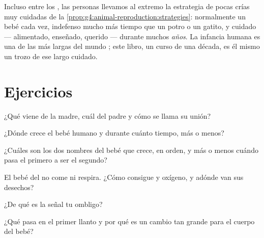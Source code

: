 \begin{example}\label{ex:g5:human-reproduction:longcare}
Incluso entre los , las personas llevamos al extremo la
estrategia de pocas crías muy cuidadas de la
\cref{prop:g4:animal-reproduction:strategies}: normalmente un bebé
cada vez, indefenso mucho más tiempo que un potro o un gatito, y
cuidado --- alimentado, enseñado, querido --- durante muchos
\emph{años}. La infancia humana es una de las más largas del mundo
; este libro, un curso de una década, es él mismo un trozo de
ese largo cuidado.
\end{example}

\section{Ejercicios}

\begin{exercise}[$\star$]\label{exo:g5:human-reproduction:1}
¿Qué  viene de la madre, cuál del padre y cómo se llama su unión?
\end{exercise}

\begin{exercise}[$\star$]\label{exo:g5:human-reproduction:2}
¿Dónde crece el bebé humano y durante cuánto tiempo, más o menos?
\end{exercise}

\begin{exercise}[$\star$]\label{exo:g5:human-reproduction:3}
¿Cuáles son los dos nombres del bebé que crece, en orden, y más o
menos cuándo pasa el primero a ser el segundo?
\end{exercise}

\begin{exercise}[$\star$]\label{exo:g5:human-reproduction:4}
El bebé del  no come ni respira. ¿Cómo consigue  y
oxígeno, y adónde van sus desechos?
\end{exercise}

\begin{exercise}[$\star$]\label{exo:g5:human-reproduction:5}
¿De qué es la señal tu ombligo?
\end{exercise}

\begin{exercise}[$\star$]\label{exo:g5:human-reproduction:6}
¿Qué pasa en el primer llanto y por qué es un cambio tan grande para
el cuerpo del bebé?
\end{exercise}

